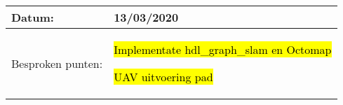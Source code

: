 \begin{tabularx}{\textwidth}{| l | X |}
  \hline
  Datum: & 13/03/2020\\
  \hline
  Besproken punten: &
  \begin{compactitem}
    \item \hl{Implementate hdl\_graph\_slam en Octomap}
    \item \hl{UAV uitvoering pad}
  \end{compactitem}\\
  \hline
\end{tabularx}